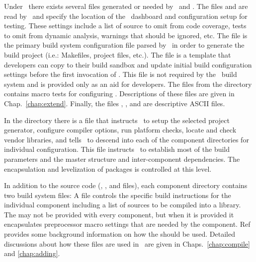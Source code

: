Under \draco\ there exists several files generated or needed by \cmake\ and \ctest.  The files   and   are read by \ctest\ and specify the location of the \draco\ dashboard and configuration setup for testing.  These settings include a list of source to omit from code coverage, tests to omit from dynamic analysis, warnings that should be ignored, etc.  The   file is the primary build system configuration file parsed by \cmake\ in order to generate the build project (i.e.: Makefiles, project files, etc.).  The   file is a template that developers can copy to their build sandbox and update initial build configuration settings before the first invocation of \cmake.  This file is not required by the \draco\ build system and is provided only as an aid for developers.
The  files from the  directory 
contains macro tests for configuring \draco.  Descriptions
of these files are given in Chap.~\ref{chap:extend}.  Finally, the
files , , and  are
descriptive ASCII files.

In the  directory there is a  file that
instructs \cmake\ to setup the selected project generator, configure compiler options, run platform checks, locate and check vendor libraries, and tells \cmake\ to descend into each of the component directories for individual configuration. This file instructs \cmake\ to establish most of the build parameters and the master structure and inter-component dependencies.  The encapsulation and levelization of packages is controlled at this level.

In addition to the source code (, , and 
files), each component directory contains two build system files: 
A  file controls the specific build instructions for the individual component including a list of sources to be compiled into a library.  The  may not be provided with every component, but when it is provided it encapsulates preprocessor macro settings that are needed by the component.  Ref~\cite{autoconf} provides some background information on how the  should be used.  Detailed discussions about how these files are used in \draco\ are given in Chaps.~\ref{chap:compile} and \ref{chap:adding}.



